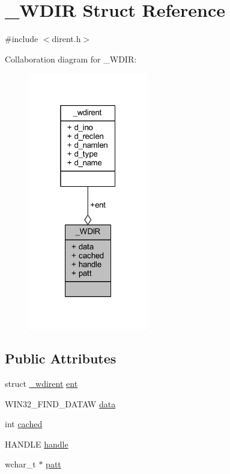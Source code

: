 \hypertarget{struct___w_d_i_r}{\section{\+\_\+\+W\+D\+I\+R Struct Reference}
\label{struct___w_d_i_r}
}


{\ttfamily \#include $<$dirent.\+h$>$}



Collaboration diagram for \+\_\+\+W\+D\+I\+R\+:
\nopagebreak
\begin{figure}[H]
\begin{center}
\leavevmode
\includegraphics[width=148pt]{struct___w_d_i_r__coll__graph}
\end{center}
\end{figure}
\subsection*{Public Attributes}
\begin{DoxyCompactItemize}
\item 
struct \hyperlink{struct__wdirent}{\+\_\+wdirent} \hyperlink{struct___w_d_i_r_a84ae1457352005f813ed4b3dc1994b62}{ent}
\item 
W\+I\+N32\+\_\+\+F\+I\+N\+D\+\_\+\+D\+A\+T\+A\+W \hyperlink{struct___w_d_i_r_a065b17b666ee06c4e8068d8accb0eef9}{data}
\item 
int \hyperlink{struct___w_d_i_r_a9b7432df163d1e291ba5925347fd4af3}{cached}
\item 
H\+A\+N\+D\+L\+E \hyperlink{struct___w_d_i_r_a694510e166fd3e797b3e15b9e4b3810a}{handle}
\item 
wchar\+\_\+t $\ast$ \hyperlink{struct___w_d_i_r_a700ff3a1096fb36452c571b0f55b4e60}{patt}
\end{DoxyCompactItemize}


